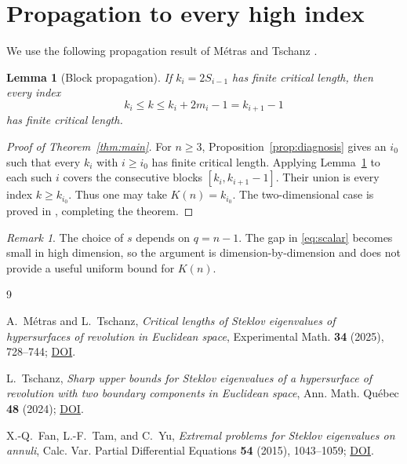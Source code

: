 \documentclass[11pt]{article}
\newtheorem{lemma}[theorem]{Lemma}
\theoremstyle{remark}
\newtheorem{remark}[theorem]{Remark}
\begin{document}
\section{Propagation to every high index}

We use the following propagation result of M\'{e}tras and Tschanz
\cite[Lemma~17]{MetrasTschanz}.

\begin{lemma}[Block propagation]\label{lem:propagation}
If $k_i=2S_{i-1}$ has finite critical length, then every index
\[
 k_i\le k\le k_i+2m_i-1=k_{i+1}-1
\]
has finite critical length.
\end{lemma}

\begin{proof}[Proof of Theorem~\ref{thm:main}]
For $n\ge3$, Proposition~\ref{prop:diagnosis} gives an $i_0$ such that
every $k_i$ with $i\ge i_0$ has finite critical length.  Applying
Lemma~\ref{lem:propagation} to each such $i$ covers the consecutive blocks
$[k_i,k_{i+1}-1]$.  Their union is every index $k\ge k_{i_0}$.  Thus one
may take $K(n)=k_{i_0}$.  The two-dimensional case is proved in
\cite{FanTamYu}, completing the theorem.
\end{proof}

\begin{remark}
The choice of $s$ depends on $q=n-1$.  The gap in
\eqref{eq:scalar} becomes small in high dimension, so the argument is
dimension-by-dimension and does not provide a useful uniform bound for
$K(n)$.
\end{remark}

\begin{thebibliography}{9}

A.~M\'{e}tras and L.~Tschanz,
\emph{Critical lengths of Steklov eigenvalues of hypersurfaces of revolution
in Euclidean space},
Experimental Math. \textbf{34} (2025), 728--744;
\href{https://doi.org/10.1080/10586458.2024.2410967}{DOI}.

L.~Tschanz,
\emph{Sharp upper bounds for Steklov eigenvalues of a hypersurface of
revolution with two boundary components in Euclidean space},
Ann. Math. Qu\'{e}bec \textbf{48} (2024);
\href{https://doi.org/10.1007/s40316-024-00225-8}{DOI}.

X.-Q.~Fan, L.-F.~Tam, and C.~Yu,
\emph{Extremal problems for Steklov eigenvalues on annuli},
Calc. Var. Partial Differential Equations \textbf{54} (2015), 1043--1059;
\href{https://doi.org/10.1007/s00526-014-0816-8}{DOI}.

\end{thebibliography}
\end{document}
